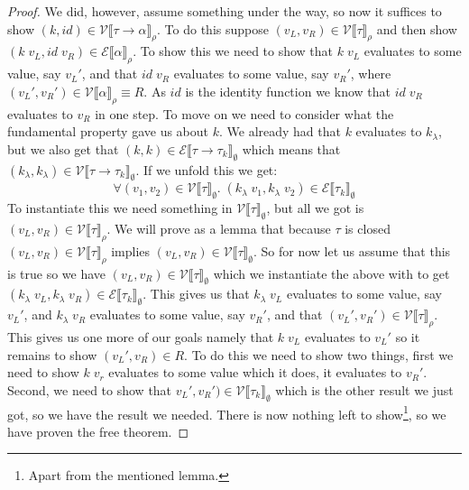 \documentclass[a4paper,10pt,fleqn]{article}
\newcommand{\sem}[1]{\ensuremath{\llbracket #1 \rrbracket}}
\newcommand{\curly}[1]{\ensuremath{\mathcal{#1}}}
\newcommand{\tarrow}[2]{\ensuremath{ #1 \rightarrow #2}}
\newcommand{\prep}[3]{\ensuremath{\curly{#1}\sem{#3}_{#2}}}
\newcommand{\eprep}[2][\rho]{\prep{E}{#1}{#2}}
\newcommand{\vprep}[2][\rho]{\prep{V}{#1}{#2}}
\begin{document}
\begin{proof}
We did, however, assume something under the way, so now it suffices to show $(k,id) \in \vprep[\rho]{\tarrow{\tau}{\alpha}}$. To do this suppose $(v_L,v_R) \in \vprep[\rho]{\tau}$ and then show $(k \; v_L, id \; v_R) \in \eprep{\alpha}$. To show this we need to show that $k \; v_L$ evaluates to some value, say $v_L'$, and that $id \; v_R$ evaluates to some value, say $v_R'$, where $(v_L',v_R') \in \vprep{\alpha} \equiv R$. As $id$ is the identity function we know that $id \; v_R$ evaluates to $v_R$ in one step. To move on we need to consider what the fundamental property gave us about $k$. We already had that $k$ evaluates to $k_\lambda$, but we also get that $(k,k) \in \eprep[\emptyset]{\tarrow{\tau}{\tau_k}}$ which means that $(k_\lambda,k_\lambda) \in \vprep[\emptyset]{\tarrow{\tau}{\tau_k}}$. If we unfold this we get:
\[
  \forall (v_1,v_2) \in \vprep[\emptyset]{\tau}. \; (k_\lambda \; v_1, k_\lambda \; v_2) \in \eprep[\emptyset]{\tau_k}
\]
To instantiate this we need something in $\vprep[\emptyset]{\tau}$, but all we got is $(v_L,v_R) \in \vprep[\rho]{\tau}$. We will prove as a lemma that because $\tau$ is closed $(v_L,v_R) \in \vprep[\rho]{\tau}$ implies $(v_L,v_R) \in \vprep[\emptyset]{\tau}$. So for now let us assume that this is true so we have $(v_L,v_R) \in \vprep[\emptyset]{\tau}$ which we instantiate the above with to get $(k_\lambda \; v_L, k_\lambda \; v_R) \in \eprep[\emptyset]{\tau_k}$. This gives us that $k_\lambda \; v_L$ evaluates to some value, say $v_L'$, and $k_\lambda \; v_R$ evaluates to some value, say $v_R'$, and that $(v_L',v_R') \in \vprep{\tau}$. This gives us one more of our goals namely that $k \; v_L$ evaluates to $v_L'$ so it remains to show $(v_L',v_R) \in R$. To do this we need to show two things, first we need to show $k \; v_r$ evaluates to some value which it does, it evaluates to $v_R'$. Second, we need to show that $v_L',v_R') \in \vprep[\emptyset]{\tau_k}$ which is the other result we just got, so we have the result we needed. There is now nothing left to show\footnote{Apart from the mentioned lemma.}, so we have proven the free theorem.
\end{proof}
\end{document}
